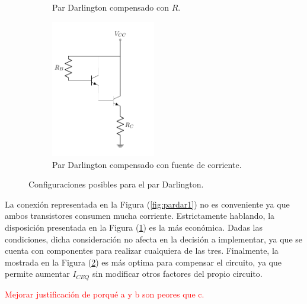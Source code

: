 \begin{figure}[H]
\begin{subfigure}{.4\textwidth}
	\caption{Par Darlington compensado con $R$.}
	\label{fig:pardar2}
\end{subfigure}
\begin{subfigure}{.5\textwidth}
\centering
	\includegraphics[width=0.5\textwidth, page=3]{Imagenes/ParDarlington.pdf}
	\caption{Par Darlington compensado con fuente de corriente.}
	\label{fig:pardar3}
\end{subfigure}
\caption{Configuraciones posibles para el par Darlington.}
\label{fig:pardar}
\end{figure}

La conexión representada en la Figura (\ref{fig:pardar1}) no es conveniente ya que ambos transistores consumen mucha corriente. Estrictamente hablando, la disposición presentada en la Figura (\ref{fig:pardar2}) es la más económica. Dadas las condiciones, dicha consideración no afecta en la decisión a implementar, ya que se cuenta con componentes para realizar cualquiera de las tres. Finalmente, la mostrada en la Figura (\ref{fig:pardar3}) es más optima para compensar el circuito, ya que permite aumentar $I_{CEQ}$ sin modificar otros factores del propio circuito.
\begin{center}
	\LARGE{\textcolor{red}{Mejorar justificación de porqué a y b son peores que c.}}
\end{center}

